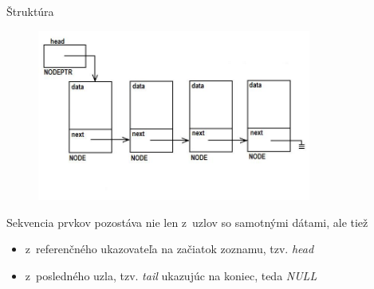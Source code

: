 \documentclass[slovak, 11pt]{beamer}
\begin{document}
\begin{frame}{Štruktúra}
    \begin{figure}[h]
      \includegraphics[width=9cm,center]{linked_list_3.jpg} 
      \vspace{-4.5em}
    \end{figure}
    \begin{alertblock}{Sekvencia prvkov}
        pozostáva nie len z~uzlov so samotnými dátami, ale tiež 
        \begin{itemize}
            \item z~referenčného ukazovateľa na začiatok zoznamu, tzv. \emph{head} 
            \item z~posledného uzla, tzv. \emph{tail} ukazujúc na koniec, teda \emph{NULL}
        \end{itemize}
    \end{alertblock}
\end{frame}

\end{document}
